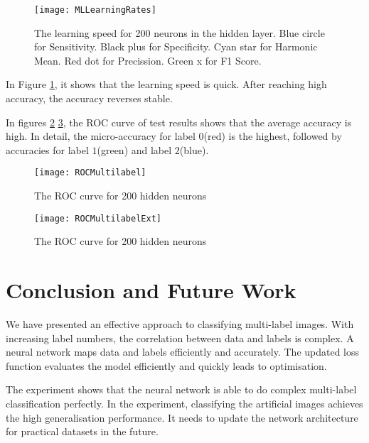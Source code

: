 \begin{figure}[htb]
\centering
\texttt{[image: MLLearningRates]}
\caption{\label{fig:MLLearningRates}The learning speed for 200 neurons in the hidden layer. Blue circle for Sensitivity. Black plus for Specificity. Cyan star for Harmonic Mean. Red dot for Precission. Green x for F1 Score.}
\end{figure}
In Figure \ref{fig:MLLearningRates}, it shows that the learning speed is quick. After reaching high accuracy, the accuracy reverses stable. 

In figures \ref{fig:MLROCCurve} \ref{fig:MLROCCurveExt}, the ROC curve of test results shows that the average accuracy is high. In detail, the micro-accuracy for label $0$(red) is the highest, followed by accuracies for label $1$(green) and label $2$(blue). 
\begin{figure}[htb]
\centering
\texttt{[image: ROCMultilabel]}
\caption{\label{fig:MLROCCurve}The ROC curve for 200 hidden neurons}
\end{figure}

\begin{figure}[htb]
\centering
\texttt{[image: ROCMultilabelExt]}
\caption{\label{fig:MLROCCurveExt}The ROC curve for 200 hidden neurons}
\end{figure}

\section{Conclusion and Future Work}

We have presented an effective approach to classifying multi-label images. With increasing label numbers, the correlation between data and labels is complex. A neural network maps data and labels efficiently and accurately. The updated loss function evaluates the model efficiently and quickly leads to optimisation.

The experiment shows that the neural network is able to do complex multi-label classification perfectly. In the experiment, classifying the artificial images achieves the high generalisation performance. It needs to update the network architecture for practical datasets in the future.












